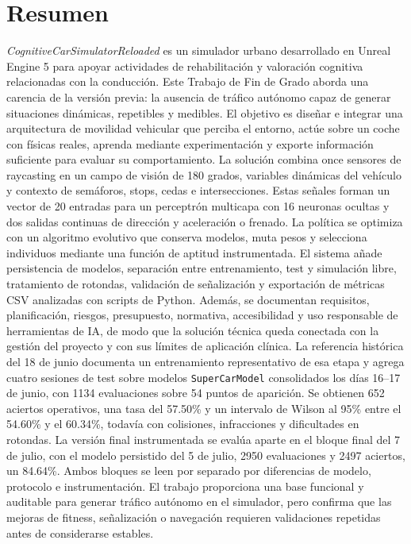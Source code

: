 \endgroup

\cleardoublepage%

\chapter*{Resumen}

\begingroup
{}
\noindent\textit{CognitiveCarSimulatorReloaded} es un simulador urbano desarrollado en Unreal Engine 5 para apoyar actividades de rehabilitación y valoración cognitiva relacionadas con la conducción. Este Trabajo de Fin de Grado aborda una carencia de la versión previa: la ausencia de tráfico autónomo capaz de generar situaciones dinámicas, repetibles y medibles. El objetivo es diseñar e integrar una arquitectura de movilidad vehicular que perciba el entorno, actúe sobre un coche con físicas reales, aprenda mediante experimentación y exporte información suficiente para evaluar su comportamiento. La solución combina once sensores de raycasting en un campo de visión de 180 grados, variables dinámicas del vehículo y contexto de semáforos, stops, cedas e intersecciones. Estas señales forman un vector de 20 entradas para un perceptrón multicapa con 16 neuronas ocultas y dos salidas continuas de dirección y aceleración o frenado. La política se optimiza con un algoritmo evolutivo que conserva modelos, muta pesos y selecciona individuos mediante una función de aptitud instrumentada. El sistema añade persistencia de modelos, separación entre entrenamiento, test y simulación libre, tratamiento de rotondas, validación de señalización y exportación de métricas CSV analizadas con scripts de Python. Además, se documentan requisitos, planificación, riesgos, presupuesto, normativa, accesibilidad y uso responsable de herramientas de IA, de modo que la solución técnica queda conectada con la gestión del proyecto y con sus límites de aplicación clínica. La referencia histórica del 18 de junio documenta un entrenamiento representativo de esa etapa y agrega cuatro sesiones de test sobre modelos \texttt{SuperCarModel} consolidados los días 16--17 de junio, con 1134 evaluaciones sobre 54 puntos de aparición. Se obtienen 652 aciertos operativos, una tasa del 57.50\% y un intervalo de Wilson al 95\% entre el 54.60\% y el 60.34\%, todavía con colisiones, infracciones y dificultades en rotondas. La versión final instrumentada se evalúa aparte en el bloque final del 7 de julio, con el modelo persistido del 5 de julio, 2950 evaluaciones y 2497 aciertos, un 84.64\%. Ambos bloques se leen por separado por diferencias de modelo, protocolo e instrumentación. El trabajo proporciona una base funcional y auditable para generar tráfico autónomo en el simulador, pero confirma que las mejoras de fitness, señalización o navegación requieren validaciones repetidas antes de considerarse estables.
\par\endgroup

